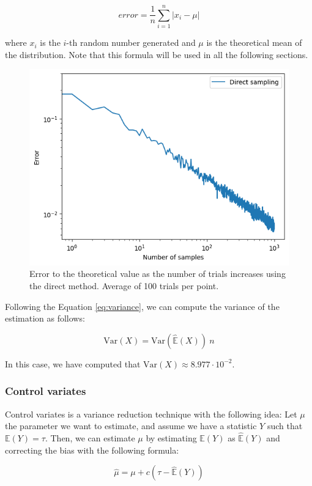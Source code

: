\documentclass{article}
\begin{document}
\begin{equation*} error = \frac{1}{n}\sum_{i=1}^{n} | x_i - \mu | \end{equation*}

where \(x_i\) is the \(i\)-th random number generated and \(\mu\) is the theoretical mean of the distribution. Note that this formula will be used in all the following sections.

\begin{figure}[H]
	\centering
	\includegraphics[width=0.5\linewidth]{./Figures/VarianceReduction/direct.png}
	\caption{Error to the theoretical value as the number of trials increases using the direct method. Average of 100 trials per point.}
	\label{fig:directmethod}
\end{figure}

Following the Equation \eqref{eq:variance}, we can compute the variance of the estimation as follows:

\begin{equation} 
	\label{eq:variancedirectmethod} 
	\mathrm{Var}(X) = \mathrm{Var}(\hat{\mathbb{E}}(X)) \ n 
\end{equation}

In this case, we have computed that \(\mathrm{Var}(X) \approx 8.977 \cdot 10^{-2}\).

\subsubsection{Control variates}
\label{sec:control_variates}

Control variates is a variance reduction technique with the following idea: Let \(\mu\) the parameter we want to estimate, and assume we have a statistic \(Y\) such that \(\mathbb{E}(Y) = \tau\). Then, we can estimate \(\mu\) by estimating \(\mathbb{E}(Y)\) as \(\hat{\mathbb{E}}(Y)\) and correcting the bias with the following formula:

\begin{equation} 
	\label{eq:controlvariates} 
	\hat{\mu} = \mu + c(\tau - \hat{\mathbb{E}}(Y)) 
\end{equation}
\end{document}
